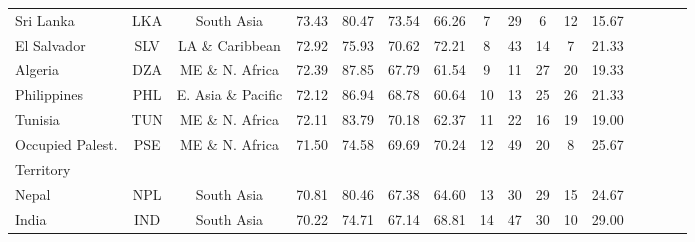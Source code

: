 \begin{singlespace}
{\begin{longtable}[H]{lccccccccccccccc}
Sri Lanka                         & LKA           & South Asia         & 73.43       & 80.47            & 73.54                     & 66.26           & 7              & 29                  & 6                            & 12                 & 15.67                  \\
El Salvador                       & SLV           & LA \& Caribbean    & 72.92       & 75.93            & 70.62                     & 72.21           & 8              & 43                  & 14                           & 7                  & 21.33                  \\
Algeria                           & DZA           & ME \& N. Africa    & 72.39       & 87.85            & 67.79                     & 61.54           & 9              & 11                  & 27                           & 20                 & 19.33                  \\
Philippines                       & PHL           & E. Asia \& Pacific & 72.12       & 86.94            & 68.78                     & 60.64           & 10             & 13                  & 25                           & 26                 & 21.33                  \\
Tunisia                           & TUN           & ME \& N. Africa    & 72.11       & 83.79            & 70.18                     & 62.37           & 11             & 22                  & 16                           & 19                 & 19.00                  \\
Occupied Palest.    & \multirow{2}{*}{PSE}           & \multirow{2}{*}{ME \& N. Africa}    & \multirow{2}{*}{71.50}       & \multirow{2}{*}{74.58}            & \multirow{2}{*}{69.69}                     & \multirow{2}{*}{70.24}           & \multirow{2}{*}{12}             & \multirow{2}{*}{49}                  & \multirow{2}{*}{20}                           & \multirow{2}{*}{8}                  & \multirow{2}{*}{25.67}                  \\
Territory \\
Nepal                             & NPL           & South Asia         & 70.81       & 80.46            & 67.38                     & 64.60           & 13             & 30                  & 29                           & 15                 & 24.67                  \\
India                             & IND           & South Asia         & 70.22       & 74.71            & 67.14                     & 68.81           & 14             & 47                  & 30                           & 10                 & 29.00                  \\

\end{longtable}}
\end{singlespace}
